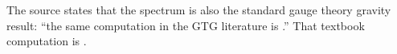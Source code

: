 The source states that the spectrum is also the standard gauge theory gravity result: ``the same computation in the GTG literature is \cite[Ch.~14]{DoranLasenby2003}.'' That textbook computation is .

